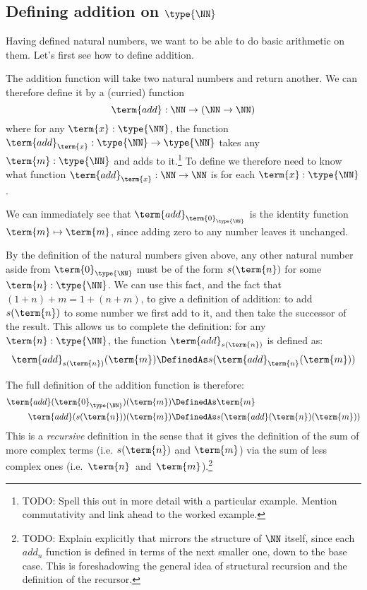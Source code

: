 \subsection{Defining addition on $\type{\NN}$}
\label{sec:NaturalNumbers-AdditionOnN}

Having defined natural numbers, we want to be able to do basic arithmetic on them.  Let's first see how to define addition.

The addition function will take two natural numbers and return another.  We can therefore define it by a (curried) function
\[
\term{add}:\NN \to (\NN \to \NN)
\]
where for any $\term{x}:\type{\NN}$, the function
$\term{add}_{\term{x}}: \type{\NN} \to \type{\NN}$
takes any $\term{m}:\type{\NN}$ and adds  to it.\footnote{
TODO: Spell this out in more detail with a particular example.  Mention commutativity and link ahead to the worked example.
}
To define  we therefore need to know what function  $\term{add}_{\term{x}}:\NN \to \NN$ is  for each 
$\term{x}:\type{\NN}$.

We can immediately see that $\term{add}_{ \term{0}_{\type{\NN}}}$ is the identity function 
$ \term{m} \mapsto \term{m}$, since adding zero to any number leaves it unchanged.  

By the definition of the natural numbers given above, any other natural number aside from $\term{0}_{\type{\NN}}$
must be of the form $s(\term{n})$ for some 
$\term{n}:\type{\NN}$.  We can use this fact, and the fact that 
$(1+n) + m = 1 + (n + m)$, to 
give a  definition of addition: to add $s(\term{n})$ to some number  we first add  to it, and then take the successor of the result.  This allows us to complete the definition:
for any $\term{n}:\type{\NN}$, 
the function $\term{add}_{s(\term{n})}$ is defined as:
\[
\term{add}_{s(\term{n})}(\term{m}) \DefinedAs
s(\term{add}_{\term{n}}(\term{m}))
\]

  The full definition of the addition function is therefore:
\begin{align*}
\term{add}(\term{0}_{\type{\NN}})(\term{m}) &\DefinedAs \term{m}
\\
\term{add}(s(\term{n}))(\term{m}) &\DefinedAs
s(\term{add}(\term{n})(\term{m}))
\end{align*}
This is a \emph{recursive} definition in the sense that it gives the definition of the sum of more complex terms 
(i.e. $s(\term{n})$ and $\term{m}$)
via the sum of less complex ones
(i.e.~$\term{n}$~and~$\term{m}$).\footnote{
TODO: Explain explicitly that  mirrors the structure of $\NN$ itself, since each $add_n$ function is defined in terms of the next smaller one, down to the base case.  This is foreshadowing the general idea of structural recursion and the definition of the recursor.
}



